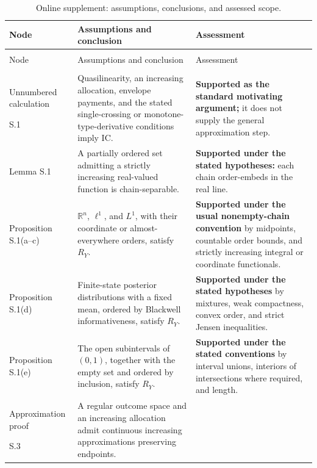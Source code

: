 \documentclass[11pt]{article}
\theoremstyle{remark}\newtheorem{remark}[theorem]{Remark}
\begin{document}
\begingroup
\small
\setlength{\tabcolsep}{3pt}
\renewcommand{\arraystretch}{1.14}
\begin{longtable}{@{}>{\raggedright\arraybackslash}p{2.60cm}>{\raggedright\arraybackslash}p{6.30cm}>{\raggedright\arraybackslash}p{6.45cm}@{}}
\caption{Online supplement: assumptions, conclusions, and assessed scope.}
\label{tab:dependency-supplement-full}\\
\toprule
Node & Assumptions and conclusion & Assessment \\
\midrule
\endfirsthead
\multicolumn{3}{@{}l}{\textit{Table \thetable\ continued}}\\
\toprule
Node & Assumptions and conclusion & Assessment \\
\midrule
\endhead
\midrule
\multicolumn{3}{r@{}}{\textit{Continued on next page}}\\
\endfoot
\bottomrule
\endlastfoot
Unnumbered calculation\par S.1
& Quasilinearity, an increasing allocation, envelope payments, and the stated single-crossing or monotone-type-derivative conditions imply IC.
& \textbf{Supported as the standard motivating argument;} it does not supply the general approximation step. \\
Lemma S.1
& A partially ordered set admitting a strictly increasing real-valued function is chain-separable.
& \textbf{Supported under the stated hypotheses:} each chain order-embeds in the real line. \\
Proposition S.1(a--c)
& $\mathbb R^n$, $\ell^1$, and $L^1$, with their coordinate or almost-everywhere orders, satisfy $R_Y$.
& \textbf{Supported under the usual nonempty-chain convention} by midpoints, countable order bounds, and strictly increasing integral or coordinate functionals. \\
Proposition S.1(d)
& Finite-state posterior distributions with a fixed mean, ordered by Blackwell informativeness, satisfy $R_Y$.
& \textbf{Supported under the stated hypotheses} by mixtures, weak compactness, convex order, and strict Jensen inequalities. \\
Proposition S.1(e)
& The open subintervals of $(0,1)$, together with the empty set and ordered by inclusion, satisfy $R_Y$.
& \textbf{Supported under the stated conventions} by interval unions, interiors of intersections where required, and length. \\
Approximation proof\par S.3
& A regular outcome space and an increasing allocation admit continuous increasing approximations preserving endpoints.

\end{longtable}
\end{document}
